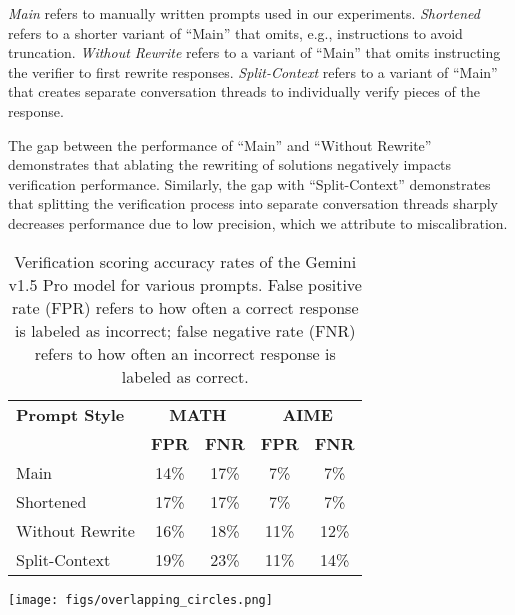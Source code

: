 \emph{Main} refers to manually written prompts used in our experiments.
\emph{Shortened} refers to a shorter variant of ``Main'' that omits, e.g., instructions to avoid truncation.
\emph{Without Rewrite} refers to a variant of ``Main'' that omits instructing the verifier to first rewrite responses.
\emph{Split-Context} refers to a variant of ``Main'' that creates separate conversation threads to individually verify pieces of the response.

The gap between the performance of ``Main'' and ``Without Rewrite'' demonstrates that ablating the rewriting of solutions negatively impacts verification performance. Similarly, the gap with ``Split-Context'' demonstrates that splitting the verification process into separate conversation threads sharply decreases performance due to low precision, which we attribute to miscalibration.

\begin{table}[htbp]
\centering
    \hfill
\begin{minipage}[t]{0.5\textwidth}
\vspace{0.4cm}
    \begin{tabular}{lcc|cc}
        \toprule
        \textbf{Prompt Style} & \multicolumn{2}{c}{\textbf{MATH}} & \multicolumn{2}{c}{\textbf{AIME}} \\
        \cmidrule(lr){2-3} \cmidrule(lr){4-5}
        & \textbf{FPR} & \textbf{FNR} & \textbf{FPR} & \textbf{FNR} \\
        \midrule
        Main            & 14\% & 17\% & 7\%  & 7\%  \\
        Shortened     & 17\% & 17\% & 7\%  & 7\%  \\
        Without Rewrite & 16\% & 18\% & 11\% & 12\% \\
        Split-Context   & 19\% & 23\% & 11\% & 14\% \\
        \bottomrule
    \end{tabular}
    \end{minipage}
    \hfill
\begin{minipage}[t]{0.45\textwidth}
\vspace{0cm}
\texttt{[image: figs/overlapping\_circles.png]}
\end{minipage}
    \caption{Verification scoring accuracy rates of the Gemini v1.5 Pro model for various prompts. False positive rate (FPR) refers to how often a correct response is labeled as incorrect; false negative rate (FNR) refers to how often an incorrect response is labeled as correct. %
    }
    \label{tab:prompt_tuning_results}
\end{table}
